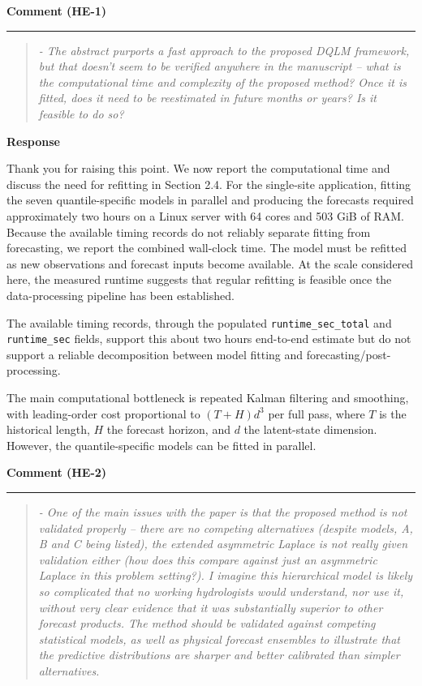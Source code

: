 \documentclass[11pt,letterpaper]{article}
\newcommand{\commentheading}[1]{%
  \vspace{6pt}\noindent\textbf{Comment (#1)}\par
  \vspace{2pt}\hrule\vspace{6pt}
}
\newenvironment{commentblock}{\begin{quote}\small\itshape}{\end{quote}}
\newcommand{\responseheading}{%
  \vspace{2pt}\noindent\textbf{Response}\par
}
\newenvironment{responsebox}{\begin{mdframed}[style=plainbox]}{\end{mdframed}}
\newcommand{\HE}[1]{HE-#1}
\begin{document}
\commentheading{\HE{1}}
\begin{commentblock}
- The abstract purports a fast approach to the proposed DQLM framework, but that doesn't seem to be verified anywhere in the manuscript -- what is the computational time and complexity of the proposed method? Once it is fitted, does it need to be reestimated in future months or years? Is it feasible to do so?
\end{commentblock}

\responseheading
\begin{responsebox}

Thank you for raising this point. We now report the computational time and discuss the need for refitting in Section 2.4. For the single-site application, fitting the seven quantile-specific models in parallel and producing the forecasts required approximately two hours on a Linux server with 64 cores and 503 GiB of RAM. Because the available timing records do not reliably separate fitting from forecasting, we report the combined wall-clock time. The model must be refitted as new observations and forecast inputs become available. At the scale considered here, the measured runtime suggests that regular refitting is feasible once the data-processing pipeline has been established.

The available timing records, through the populated \texttt{runtime\_sec\_total} and \texttt{runtime\_sec} fields, support this about two hours end-to-end estimate but do not support a reliable decomposition between model fitting and forecasting/post-processing.

The main computational bottleneck is repeated Kalman filtering and smoothing, with leading-order cost proportional to \((T+H)d^{3}\) per full pass, where \(T\) is the historical length, \(H\) the forecast horizon, and \(d\) the latent-state dimension. However, the quantile-specific models can be fitted in parallel.
\end{responsebox}

\commentheading{\HE{2}}
\begin{commentblock}
- One of the main issues with the paper is that the proposed method is not validated properly -- there are no competing alternatives (despite models, A, B and C being listed), the extended asymmetric Laplace is not really given validation either (how does this compare against just an asymmetric Laplace in this problem setting?). I imagine this hierarchical model is likely so complicated that no working hydrologists would understand, nor use it, without very clear evidence that it was substantially superior to other forecast products. The method should be validated against competing statistical models, as well as physical forecast ensembles to illustrate that the predictive distributions are sharper and better calibrated than simpler alternatives.
\end{commentblock}
\end{document}

